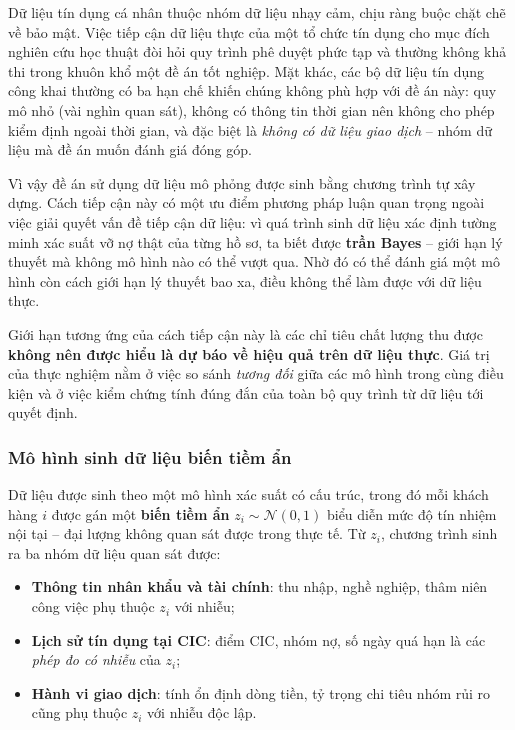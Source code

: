 Dữ liệu tín dụng cá nhân thuộc nhóm dữ liệu nhạy cảm, chịu ràng buộc chặt chẽ về
bảo mật. Việc tiếp cận dữ liệu thực của một tổ chức tín dụng cho mục đích nghiên
cứu học thuật đòi hỏi quy trình phê duyệt phức tạp và thường không khả thi trong
khuôn khổ một đề án tốt nghiệp. Mặt khác, các bộ dữ liệu tín dụng công khai
thường có ba hạn chế khiến chúng không phù hợp với đề án này: quy mô nhỏ (vài
nghìn quan sát), không có thông tin thời gian nên không cho phép kiểm định ngoài
thời gian, và đặc biệt là \textit{không có dữ liệu giao dịch} -- nhóm dữ liệu mà
đề án muốn đánh giá đóng góp.

Vì vậy đề án sử dụng dữ liệu mô phỏng được sinh bằng chương trình tự xây dựng.
Cách tiếp cận này có một ưu điểm phương pháp luận quan trọng ngoài việc giải
quyết vấn đề tiếp cận dữ liệu: vì quá trình sinh dữ liệu xác định tường minh xác
suất vỡ nợ thật của từng hồ sơ, ta biết được \textbf{trần Bayes} -- giới hạn lý
thuyết mà không mô hình nào có thể vượt qua. Nhờ đó có thể đánh giá một mô hình
còn cách giới hạn lý thuyết bao xa, điều không thể làm được với dữ liệu thực.

Giới hạn tương ứng của cách tiếp cận này là các chỉ tiêu chất lượng thu được
\textbf{không nên được hiểu là dự báo về hiệu quả trên dữ liệu thực}. Giá trị
của thực nghiệm nằm ở việc so sánh \textit{tương đối} giữa các mô hình trong cùng điều kiện và ở việc
kiểm chứng tính đúng đắn của toàn bộ quy trình từ dữ liệu tới quyết định.

\subsubsection{Mô hình sinh dữ liệu biến tiềm ẩn}

Dữ liệu được sinh theo một mô hình xác suất có cấu trúc, trong đó mỗi khách hàng
$i$ được gán một \textbf{biến tiềm ẩn} $z_i \sim \mathcal{N}(0, 1)$ biểu diễn
mức độ tín nhiệm nội tại -- đại lượng không quan sát được trong thực tế. Từ
$z_i$, chương trình sinh ra ba nhóm dữ liệu quan sát được:

\begin{itemize}
  \item \textbf{Thông tin nhân khẩu và tài chính}: thu nhập, nghề nghiệp, thâm
  niên công việc phụ thuộc $z_i$ với nhiễu;
  \item \textbf{Lịch sử tín dụng tại CIC}: điểm CIC, nhóm nợ, số ngày quá hạn là
  các \textit{phép đo có nhiễu} của $z_i$;
  \item \textbf{Hành vi giao dịch}: tính ổn định dòng tiền, tỷ trọng chi tiêu
  nhóm rủi ro cũng phụ thuộc $z_i$ với nhiễu độc lập.
\end{itemize}

